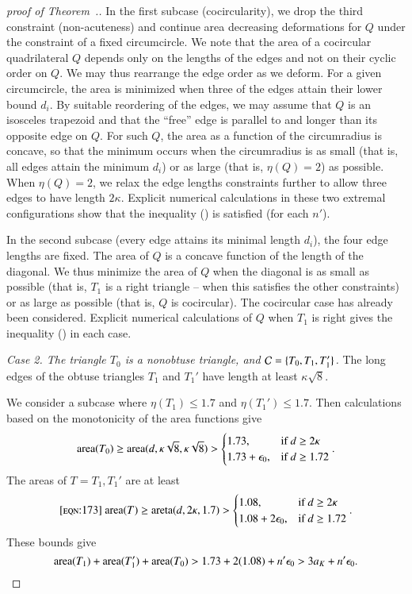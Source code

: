\begin{proof}[proof of Theorem~.]
In the first subcase (cocircularity), we drop the third constraint
(non-acuteness) and continue area decreasing deformations for $Q$
under the constraint of a fixed circumcircle.  We note that the area of
a cocircular quadrilateral $Q$ depends only on the lengths of the
edges and not on their cyclic order on $Q$.  We may thus rearrange the
edge order as we deform.  For a given circumcircle, the area is
minimized when three of the edges attain their lower bound $d_i$.  By
suitable reordering of the edges, we may assume that $Q$ is an
isosceles trapezoid and that the ``free'' edge is parallel to and
longer than its opposite edge on $Q$.  For such $Q$, the area as a
function of the circumradius is concave, so that the minimum occurs
when the circumradius is as small (that is, all edges attain the
minimum $d_i$) or as large (that is, $\eta(Q)=2$) as possible.
When $\eta(Q)=2$, we relax the edge lengths constraints further
to allow three edges to have length $2\kappa$.
Explicit numerical calculations in these two extremal configurations
show that the inequality () is satisfied (for each $n'$).

In the second subcase (every edge attains its minimal length $d_i$), the
four edge lengths are fixed.  The area of $Q$ is a concave function of
the length of the diagonal.  We thus minimize the area of $Q$ when the
diagonal is as small as possible (that is, $T_1$ is a right triangle
-- when this satisfies the other constraints) or as large as possible
(that is, $Q$ is cocircular).  The cocircular case has already been
considered.  Explicit numerical calculations of $Q$ when $T_1$ is
right gives the inequality () in each case.




{\it Case 2. The triangle $T_0$ is a nonobtuse triangle, and $\mathcal C=\{T_0,T_1,T_1'\}$.}
The long edges of the obtuse triangles $T_1$ and $T_1'$ have length at least
$\kappa\sqrt{8}$.

We consider a subcase where $\eta(T_1)\le 1.7$ and $\eta(T_1') \le
1.7$.  Then calculations based on the monotonicity of the area
functions give
\[
{\operatorname{area}}(T_0) \ge {\operatorname{area}}(d,\kappa\sqrt{8},\kappa\sqrt{8}) > 
   \begin{cases}1.73,&\text{if } d \ge 2\kappa\\ 
     1.73+\epsilon_0, & \text{if } d \ge 1.72 \end{cases}.
\]
The areas of $T=T_1,T_1'$ are at least
\begin{equation}\libel{eqn:173}
\area(T) \ge \areta(d,2\kappa,1.7) >
   \begin{cases}1.08,&\text{if } d \ge 2\kappa\\
     1.08+2\epso, & \text{if } d \ge 1.72 \end{cases}.
\end{equation}
These bounds give
\[
{\operatorname{area}}(T_1) + {\operatorname{area}}(T_1') + {\operatorname{area}}(T_0) > 1.73 + 2(1.08) + n'\epsilon_0 > 
3 a_K + n' \epsilon_0.
\]


\end{proof}
